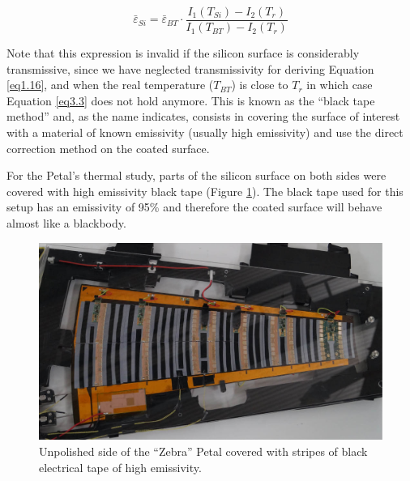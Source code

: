 		\begin{equation}\label{eq3.3}
			\bar{\varepsilon}_{Si} = \bar{\varepsilon}_{BT} \cdot \frac{I_{1}(T_{Si}) - I_{2}(T_{r})}{I_{1}(T_{BT}) - I_{2}(T_{r})}
		\end{equation}\bigskip
	
		Note that this expression is invalid if the silicon surface is considerably transmissive, since we have neglected transmissivity for deriving Equation \ref{eq1.16}, and when the real temperature ($T_{BT}$) is close to $T_{r}$ in which case Equation \ref{eq3.3} does not hold anymore. This is known as the “black tape method” and, as the name indicates, consists in covering the surface of interest with a material of known emissivity (usually high emissivity) and use the direct correction method on the coated surface.
		
		For the Petal’s thermal study, parts of the silicon surface on both sides were covered with high emissivity black tape (Figure \ref{fig3.2}). The black tape used for this setup has an emissivity of 95\% and therefore the coated surface will behave almost like a blackbody. 
	
		\begin{figure}[ht!]
			\centering
			\captionsetup{justification=centering,margin=2cm}
			\includegraphics[scale=0.40]{Figures/Chapter03/ZebraPetal.jpg}
			\caption{Unpolished side of the “Zebra” Petal covered with stripes of black electrical tape of high emissivity.}\label{fig3.2}
		\end{figure}
	

